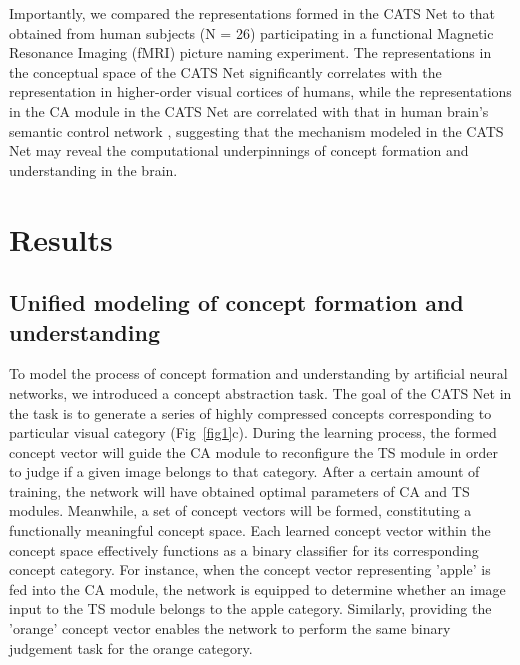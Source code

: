 \documentclass[pdflatex,sn-mathphys-num,lineno]{sn-jnl}%
\begin{document}
\begin{CJK}{UTF8}{gbsn}
Importantly, we compared the representations formed in the CATS Net to that obtained from human subjects (N = 26) participating in a functional Magnetic Resonance Imaging (fMRI) picture naming experiment. The representations in the conceptual space of the CATS Net significantly correlates with the representation in higher-order visual cortices of humans, while the representations in the CA module in the CATS Net are correlated with that in human brain’s semantic control network \cite{jackson_neural_2021}, suggesting that the mechanism modeled in the CATS Net may reveal the computational underpinnings of concept formation and understanding in the brain.

\section{Results}\label{sec_result}
\subsection{Unified modeling of concept formation and understanding}\label{subsec_model_arch}

To model the process of concept formation and understanding by artificial neural networks, we introduced a concept abstraction task. The goal of the CATS Net in the task is to generate a series of highly compressed concepts corresponding to particular visual category (Fig~\ref{fig1}c). During the learning process, the formed concept vector will guide the CA module to reconfigure the TS module in order to judge if a given image belongs to that category. After a certain amount of training, the network will have obtained optimal parameters of CA and TS modules. Meanwhile, a set of concept vectors will be formed, constituting a functionally meaningful concept space. Each learned concept vector within the concept space effectively functions as a binary classifier for its corresponding concept category. For instance, when the concept vector representing 'apple' is fed into the CA module, the network is equipped to determine whether an image input to the TS module belongs to the apple category. Similarly, providing the 'orange' concept vector enables the network to perform the same binary judgement task for the orange category.


\end{CJK}
\end{document}
